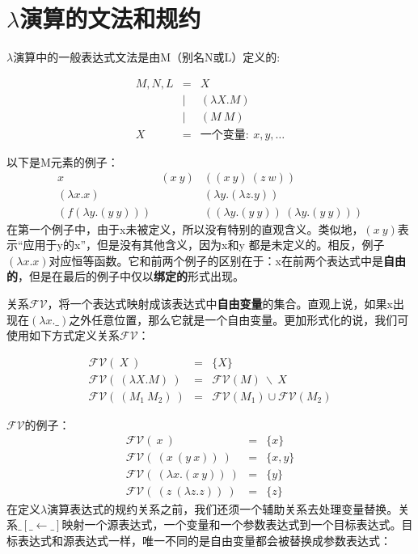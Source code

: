 \documentclass{book}
\begin{document}
\section{$\lambda$演算的文法和规约}
$\lambda$演算中的一般表达式文法是由M（别名N或L）定义的:
\begin{framed}
$$
\begin{array}{lcl}
M,N,L & = & X \\
& | & (\lambda X.M) \\
& | & (M\ M) \\
X & = & \text{一个变量}:\ x,y,\ldots
\end{array}
$$
\end{framed}
以下是M元素的例子：
$$
\begin{array}{ccc}
x &(x\ y)&((x\ y)\ (z\ w))\\
(\lambda x.x) & & (\lambda y.(\lambda z.y))\\
(f(\lambda y.(y\ y))) & & ((\lambda y.(y\ y))\ (\lambda y.(y\ y)))
\end{array}
$$
在第一个例子中，由于x未被定义，所以没有特别的直观含义。类似地，$(x\ y)$表示“应用于y的x”，但是没有其他含义，因为x和y 都是未定义的。相反，例子$(\lambda x.x)$对应恒等函数。它和前两个例子的区别在于：x在前两个表达式中是\textbf{自由的}，但是在最后的例子中仅以\textbf{绑定的}形式出现。\par
关系$\mathcal{FV}$，将一个表达式映射成该表达式中\textbf{自由变量}的集合。直观上说，如果x出现在$(\lambda x.\_)$之外任意位置，那么它就是一个自由变量。更加形式化的说，我们可使用如下方式定义关系$\mathcal{FV}$：
\begin{framed}
$$
\begin{array}{lll}
\mathcal{FV}(\ X\ ) & = & \{X\}\\
\mathcal{FV}(\ (\lambda X.M)\ ) & = & \mathcal{FV}(M)\ \backslash\ {X}\\
\mathcal{FV}(\ (M_1\ M_2)\ ) & = & \mathcal{FV}(M_1)\cup \mathcal{FV}(M_2)
\end{array}
$$
\end{framed}
$\mathcal{FV}$的例子：
$$
\begin{array}{lll}
\mathcal{FV}(\ x\ ) & = & \{x\}\\
\mathcal{FV}(\ (x\ (y\ x))\ ) & = & \{x,y\}\\
\mathcal{FV}(\ (\lambda x.(x\ y))\ ) & = & \{y\}\\
\mathcal{FV}(\ (z\ (\lambda z.z))\ ) & = & \{z\}
\end{array}
$$
在定义$\lambda$演算表达式的规约关系之前，我们还须一个辅助关系去处理变量替换。关系$\_[\_\leftarrow\_]$映射一个源表达式，一个变量和一个参数表达式到一个目标表达式。目标表达式和源表达式一样，唯一不同的是自由变量都会被替换成参数表达式：
\end{document}
